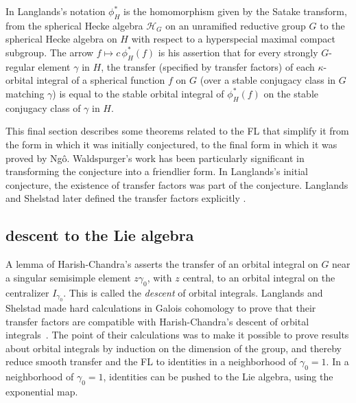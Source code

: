 \documentclass[brochure,english,12pt]{bourbaki}
\begin{document}
 In Langlands's notation $\phi_H^*$ is the homomorphism given by the
 Satake transform, from the spherical Hecke algebra ${\mathcal H}_G$
 on an unramified reductive group $G$ to the spherical Hecke algebra
 on $H$ with respect to a hyperspecial maximal compact subgroup.  The
 arrow $f\mapsto c\,\phi_H^*(f)$ is his assertion that for every
 strongly $G$-regular element $\gamma$ in $H$, the transfer (specified by
 transfer factors) of each $\kappa$-orbital integral of a spherical
 function $f$ on $G$ (over a stable conjugacy class in $G$ matching
 $\gamma$) is equal to the stable orbital integral of $\phi_H^*(f)$ on
 the stable conjugacy class of $\gamma$ in $H$.

 This final section describes some theorems related to the FL that
 simplify it from the form in which it was initially conjectured, to
 the final form in which it was proved by Ng\^o.  Waldspurger's work has
 been particularly significant in transforming the conjecture into a
 friendlier form.  In Langlands's initial conjecture, the existence of
 transfer factors was part of the conjecture.  Langlands and Shelstad
 later defined the transfer factors explicitly \cite{LS:1987}.

\subsection{descent to the Lie algebra}\label{sec:descent}

A lemma of Harish-Chandra's asserts the transfer of an orbital
integral on $G$ near a singular semisimple element $z\gamma_0$, with
$z$ central, to an orbital integral on the centralizer $I_{\gamma_0}$.
This is called the {\it descent} of orbital integrals.  Langlands and
Shelstad made hard calculations in Galois cohomology to prove that their
transfer factors are compatible with Harish-Chandra's descent of
orbital integrals~\cite{LS:1990}.  The point of their calculations was
to make it possible to prove results about orbital integrals by
induction on the dimension of the group, and thereby reduce smooth
transfer and the FL to identities in a neighborhood of $\gamma_0=1$.
In a neighborhood of $\gamma_0=1$, identities can be pushed to the Lie
algebra, using the exponential map.
\end{document}
